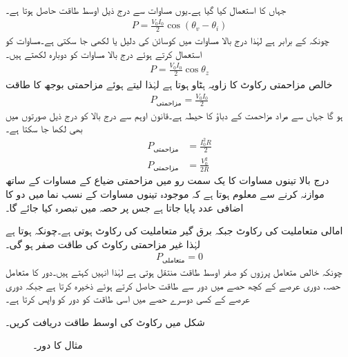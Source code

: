 جہاں  کا استعمال کیا گیا ہے۔یوں مساوات  سے درج ذیل اوسط طاقت حاصل  ہوتا ہے۔
\begin{align}\label{مساوات_طاقت_عمومی_الف}
P=\frac{V_0 I_0}{2}\cos(\theta_v-\theta_i)
\end{align}
چونکہ  کے برابر ہے لہٰذا درج بالا مساوات میں کوسائن کی دلیل  یا  لکھی جا سکتی ہے۔مساوات  کو استعمال کرتے ہوئے درج بالا مساوات کو دوبارہ لکھتے ہیں۔
\begin{align}\label{مساوات_طاقت_عمومی_ب}
P=\frac{V_0 I_0}{2}\cos \theta_z
\end{align}
خالص مزاحمتی رکاوٹ  کا زاویہ ہٹاو  ہوتا ہے لہٰذا  لیتے ہوئے مزاحمتی بوجھ کا طاقت
\begin{align}\label{مساوات_طاقت_مزاحمتی_طاقت_الف}
P_{\text{مزاحمتی}}=\frac{V_0 I_0}{2}
\end{align}
ہو گا جہاں  سے مراد مزاحمت کے دباؤ کا حیطہ ہے۔قانون اوہم سے درج بالا کو درج ذیل صورتوں میں بھی لکھا جا سکتا ہے۔
\begin{align}
P_{\text{مزاحمتی}}&=\frac{I^2_0 R}{2} \label{مساوات_طاقت_مزاحمتی_طاقت_ب}\\
P_{\text{مزاحمتی}}&=\frac{V^2_0}{2 R} \label{مساوات_طاقت_مزاحمتی_طاقت_پ}
\end{align}
درج بالا تینوں مساوات کا یک سمت رو میں مزاحمتی ضیاع کے مساوات کے ساتھ موازنہ کرنے سے معلوم ہوتا ہے کہ موجودہ تینوں مساوات کے نسب نما میں دو  کا اضافی عدد پایا جاتا ہے جس پر حصہ  میں  تبصرہ کیا جائے گا۔

امالی متعاملیت کی رکاوٹ  جبکہ برق گیر متعاملیت کی رکاوٹ  ہوتی ہے۔چونکہ  ہوتا ہے لہٰذا غیر مزاحمتی رکاوٹ کی طاقت صفر ہو گی۔
\begin{align}
P_{\text{متعاملی}} =0
\end{align}
چونکہ خالص متعامل پرزوں کو صفر اوسط طاقت منتقل ہوتی ہے لہٰذا انہیں  کہتے ہیں۔دور کا متعامل حصہ، دوری عرصے کے کچھ حصے میں  دور سے طاقت حاصل کرتے ہوئے  ذخیرہ کرتا ہے  جبکہ دوری عرصے کے کسی دوسرے حصے میں اسی طاقت کو دور کو واپس کرتا ہے۔

شکل  میں رکاوٹ کی اوسط طاقت دریافت کریں۔
\begin{figure}
\centering
{}
\caption{مثال  کا دور۔}
\label{مشق_طاقت_مزاحمت_امالہ_الف}
\end{figure}

